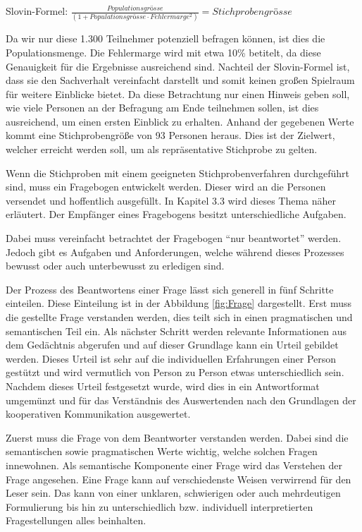 \hspace*{12mm}%
Slovin-Formel: $\frac{ Populationsgrösse }{ (1 + Populationsgrösse \cdot Fehlermarge^{ 2 }) } = Stichprobengrösse$

Da wir nur diese 1.300 Teilnehmer potenziell befragen können, ist dies die Populationsmenge\autocite{SapReporting}. %
Die Fehlermarge wird mit etwa 10\% betitelt, da diese Genauigkeit für die Ergebnisse ausreichend sind. 
Nachteil der Slovin-Formel ist, dass sie den Sachverhalt vereinfacht darstellt und somit keinen großen Spielraum für weitere Einblicke bietet. 
Da diese Betrachtung nur einen Hinweis geben soll, wie viele Personen an der Befragung am Ende teilnehmen sollen, ist dies ausreichend, um einen ersten Einblick zu erhalten.
Anhand der gegebenen Werte kommt eine Stichprobengröße von 93 Personen heraus.
Dies ist der Zielwert, welcher erreicht werden soll, um als repräsentative Stichprobe zu gelten.

Wenn die Stichproben mit einem geeigneten Stichprobenverfahren durchgeführt sind, muss ein Fragebogen entwickelt werden. 
Dieser wird an die Personen versendet und hoffentlich ausgefüllt. 
In Kapitel 3.3 wird dieses Thema näher erläutert. 
Der Empfänger eines Fragebogens besitzt unterschiedliche Aufgaben.

Dabei muss vereinfacht betrachtet der Fragebogen \enquote{nur beantwortet} werden.
Jedoch gibt es Aufgaben und Anforderungen, welche während dieses Prozesses bewusst oder auch unterbewusst zu erledigen sind.


Der Prozess des Beantwortens einer Frage lässt sich generell in fünf Schritte einteilen.
Diese Einteilung ist in der Abbildung \ref{fig:Frage} dargestellt.
Erst muss die gestellte Frage verstanden werden, dies teilt sich in einen pragmatischen und semantischen Teil ein. 
Als nächster Schritt werden relevante Informationen aus dem Gedächtnis abgerufen und auf dieser Grundlage kann ein Urteil gebildet werden. 
Dieses Urteil ist sehr auf die individuellen Erfahrungen einer Person gestützt und wird vermutlich von Person zu Person etwas unterschiedlich sein. 
Nachdem dieses Urteil festgesetzt wurde, wird dies in ein Antwortformat umgemünzt und für das Verständnis des Auswertenden nach den Grundlagen der kooperativen Kommunikation ausgewertet\autocite[S.19ff]{2014Fragebogen}.%

Zuerst muss die Frage von dem Beantworter verstanden werden. 
Dabei sind die semantischen sowie pragmatischen Werte wichtig, welche solchen Fragen innewohnen.
Als semantische Komponente einer Frage wird das Verstehen der Frage angesehen.
Eine Frage kann auf verschiedenste Weisen verwirrend für den Leser sein. 
Das kann von einer unklaren, schwierigen oder auch mehrdeutigen Formulierung bis hin zu unterschiedlich bzw. individuell interpretierten Fragestellungen alles beinhalten. 

